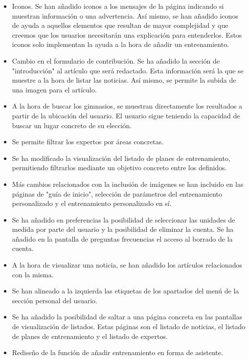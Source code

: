 \documentclass[a4paper]{article}
\begin{document}
\begin{itemize}
	\item   Iconos. Se han añadido iconos a los mensajes de la página indicando si muestran información o una advertencia. Así mismo, se han añadido iconos de ayuda a aquellos elementos que resultan de mayor complejidad y que creemos que los usuarios necesitarán una explicación para entenderlos. Estos iconos solo implementan la ayuda a la hora de añadir un entrenamiento.
	
	\item   Cambio en el formulario de contribución. Se ha añadido la sección de "introducción" al artículo que será redactado. Esta información será la que se muestre a la hora de listar las noticias. Así mismo, se permite la subida de una imagen para el artículo.
	
	\item   A la hora de buscar los gimnasios, se muestran directamente los resultados a partir de la ubicación del usuario. El usuario sigue teniendo la capacidad de buscar un lugar concreto de su elección.
	
	\item   Se permite filtrar los expertos por áreas concretas.
	
	\item   Se ha modificado la visualización del listado de planes de entrenamiento, permitiendo filtrarlos mediante un objetivo concreto entre los definidos.
	
	\item   Más cambios relacionados con la inclusión de imágenes se han incluido en las páginas de "guía de inicio", selección de parámetros del entrenamiento personalizado y el entrenamiento personalizado en sí.
	
	\item   Se ha añadido en preferencias la posibilidad de seleccionar las unidades de medida por parte del usuario y la posibilidad de eliminar la cuenta. Se ha añadido en la pantalla de preguntas frecuencias el acceso al borrado de la cuenta.
	
	\item   A la hora de visualizar una noticia, se han añadido los artículos relacionados con la misma.
	
	
	\item   Se han alineado a la izquierda las etiquetas de los apartados del menú de la sección personal del usuario.
	
	\item   Se ha añadido la posibilidad de saltar a una página concreta en las pantallas de visualización de listados. Estas páginas son el listado de noticias, el listado de planes de entrenamiento y el listado de expertos.
	
	\item   Rediseño de la función de añadir entrenamiento en forma de asistente. 
\end{itemize}
\end{document}
